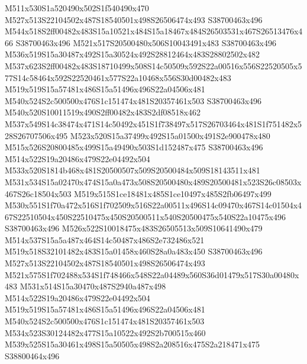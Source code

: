 \documentclass{article}
\begin{document}
\begin{multicols}{2}
M511x530S1a520490x502S1f540490x470 M527x513S22104502x487S18540501x498S26506474x493 S38700463x496 M544x518S2ff00482x483S15a10521x484S15a18467x484S26503531x467S26513476x466 S38700463x496 M521x517S20500480x506S10043491x483 S38700463x496 M536x519S15a30487x492S15a30524x492S28812464x483S28802502x482 M537x623S2ff00482x483S18710499x508S14c50509x592S22a00516x556S22520505x577S14c58464x592S22520461x577S22a10468x556S30d00482x483 M519x519S15a57481x486S15a51496x496S22a04506x481 M540x524S2c500500x476S1c151474x481S20357461x503 S38700463x496 M540x520S10011519x490S2ff00482x483S2df08518x462 M537x549S14c38474x471S14c50492x451S1f738497x517S26703464x481S1f751482x528S26707506x495 M523x520S15a37499x492S15a01500x491S2e900478x480 M515x526S20800485x499S15a49490x503S1d152487x475 S38700463x496 M514x522S19a20486x479S22e04492x504 M533x520S1814b468x481S20500507x509S20500484x509S18143511x481 M531x534S15a02470x474S15a0a473x508S20500480x489S20500481x523S26c08503x467S26c18504x503 M519x515S1ce18481x485S1ce10497x485S2fb06497x499 M530x551S1f70a472x516S1f702509x516S22a00511x496S14c09470x467S14c01504x467S22510504x450S22510475x450S20500511x540S20500475x540S22a10475x496 S38700463x496 M526x522S10018475x483S26505513x509S10641490x479 M514x537S15a5a487x464S14c50487x486S2e732486x521 M519x518S32101482x483S15a01458x460S28a0a483x450 S38700463x496 M527x513S22104502x487S18540501x498S26506474x493 M521x575S1f702488x534S1f748466x548S22a04489x560S36d01479x517S30a00480x483 M531x514S15a30470x487S2940a487x498 M514x522S19a20486x479S22e04492x504 M519x519S15a57481x486S15a51496x496S22a04506x481 M540x524S2c500500x476S1c151474x481S20357461x503 M534x523S30124482x477S15a10522x492S2b700515x460 M539x525S15a30461x498S15a50505x498S2a208516x475S2a218471x475 S38800464x496


\end{multicols}
\end{document}

